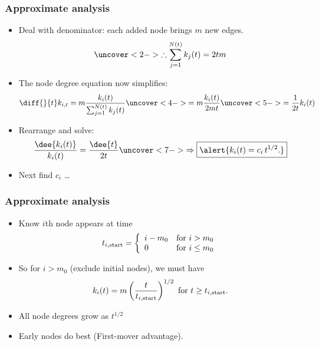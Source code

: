 \begin{frame}[label=]
 \frametitle{Approximate analysis}  

 \begin{itemize}
 \item<1->
   Deal with denominator: each added node brings $m$ new edges.
   $$
   \uncover<2->{
     \therefore 
     \sum_{j=1}^{N(t)} k_j(t)
     =
     2 t m
   }
   $$
 \item<3->
   The node degree equation now simplifies:
   $$
   \diff{}{t} k_{i,t}
   =
   m
   \frac{k_{i}(t)}
   {
     \sum_{j=1}^{N(t)} k_j(t)
   }
   \uncover<4->{
     =
     m
     \frac{k_{i}(t)}
     {
       2 m t
     }
   }
   \uncover<5->{
     =
     \frac{1}
     {
       2 t
     }
     k_{i}(t)
   }
   $$
 \item<6->
   Rearrange and solve:
   $$
   \frac{\dee{k_{i}(t)}}
   {k_{i}(t)}
   =
   \frac{\dee{t}}
   {2t}
   \uncover<7->{
     \Rightarrow
     \boxed{\alert{k_i(t) = c_i \,  t^{1/2}.}}
   }
   $$
 \item<8->
   Next find $c_i$ \ldots
 \end{itemize}

\end{frame}

\begin{frame}[label=]
 \frametitle{Approximate analysis}  

 \begin{itemize}
 \item<1->
   Know $i$th node appears at time 
   $$
   t_{i,\textnormal{start}} = \left\{
     \begin{array}{ll}
       i-m_0 & \mbox{for $i>m_0$} \\
       0 & \mbox{for $i \le m_0$}
     \end{array}
   \right.
   $$
 \item<2->
   So for $i>m_0$ (exclude initial nodes),
   we must have
   $$
   k_i(t) 
   = 
   m 
   \left(
   \frac{t}{t_{i,\textnormal{start}}}
   \right)^{1/2}
   \
   \mbox{for $t \ge t_{i,\textnormal{start}}$}.
   $$
 \item<3-> 
   All node degrees grow as \alert{$t^{1/2}$}
 \item<5-> 
   Early nodes do \alert{best} (First-mover advantage).
 \end{itemize}
 
\end{frame}

